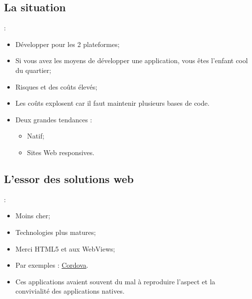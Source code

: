 \documentclass[10pt]{beamer}
\begin{document}
\subsection{La situation}
\begin{frame}[fragile,t]{\secname : \subsecname}
    \begin{itemize}
        \item Développer pour les 2 plateformes;
        \item Si vous avez les moyens de développer une application, vous êtes l'enfant cool du quartier;
        \item Risques et des coûts élevés;
        \item Les coûts explosent car il faut maintenir plusieurs bases de code.
        \item Deux grandes tendances :
              \begin{itemize}
                  \item Natif;
                  \item Sites Web responsives.
              \end{itemize}
    \end{itemize}
\end{frame}

\subsection{L'essor des solutions web}
\begin{frame}[fragile,t]{\secname : \subsecname}
    \begin{itemize}
        \item Moins cher;
        \item Technologies plus matures;
        \item Merci HTML5 et aux WebViews;
        \item Par exemples : \href{https://cordova.apache.org}{Cordova}.
        \item Ces applications avaient souvent du mal à reproduire l'aspect et la convivialité des applications natives.
    \end{itemize}
\end{frame}
\end{document}
